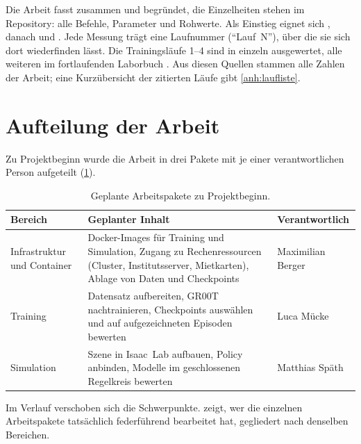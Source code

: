 Die Arbeit fasst zusammen und begründet, die Einzelheiten stehen im Repository: alle Befehle,
Parameter und Rohwerte. Als Einstieg eignet sich , danach
 und . Jede Messung trägt eine Laufnummer
(\enquote{Lauf~N}), über die sie sich dort wiederfinden lässt. Die Trainingsläufe 1--4 sind in
 einzeln ausgewertet, alle weiteren im fortlaufenden Laborbuch
. Aus diesen Quellen stammen alle Zahlen der Arbeit;
eine Kurzübersicht der zitierten Läufe gibt \cref{anh:laufliste}.

\section{Aufteilung der Arbeit}
\label{sec:eigenleistung}

Zu Projektbeginn wurde die Arbeit in drei Pakete mit je einer verantwortlichen Person
aufgeteilt (\cref{tab:plan}).

\begin{table}[htb]
  \centering
  \small
  \begin{tabularx}{\linewidth}{>{\raggedright\arraybackslash}p{2.5cm}>{\raggedright\arraybackslash}Xl}
    \toprule
    Bereich & Geplanter Inhalt & Verantwortlich \\
    \midrule
    Infrastruktur und Container & Docker-Images für Training und Simulation, Zugang zu
      Rechenressourcen (Cluster, Institutsserver, Mietkarten), Ablage von Daten und
      Checkpoints & Maximilian Berger \\
    \addlinespace
    Training & Datensatz aufbereiten, GR00T nachtrainieren, Checkpoints auswählen und auf
      aufgezeichneten Episoden bewerten & Luca Mücke \\
    \addlinespace
    Simulation & Szene in Isaac~Lab aufbauen, Policy anbinden, Modelle im geschlossenen
      Regelkreis bewerten & Matthias Späth \\
    \bottomrule
  \end{tabularx}
  \caption{Geplante Arbeitspakete zu Projektbeginn.}
  \label{tab:plan}
\end{table}

Im Verlauf verschoben sich die Schwerpunkte.  zeigt, wer die einzelnen
Arbeitspakete tatsächlich federführend bearbeitet hat, gegliedert nach denselben Bereichen.

